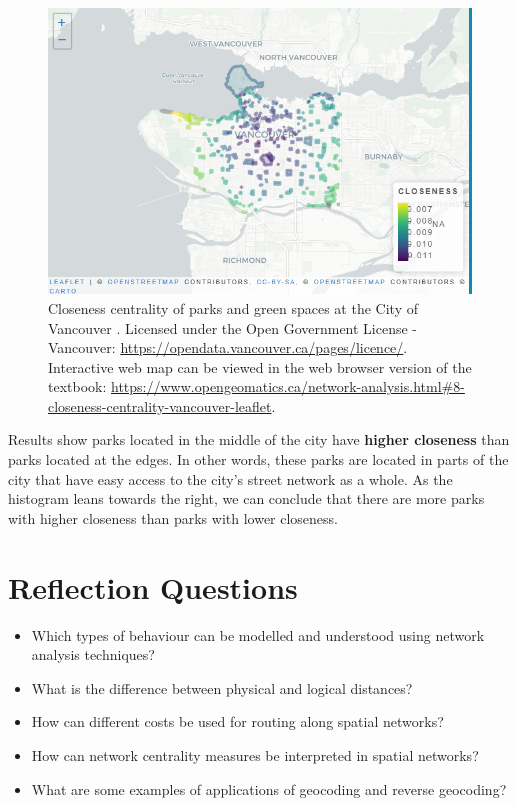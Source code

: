 \documentclass[
]{book}
\providecommand{\tightlist}{%
  \setlength{\itemsep}{0pt}\setlength{\parskip}{0pt}}
\begin{document}
\begin{figure}
\includegraphics[width=10.18in]{images/08-CLOSENESS-CENTRALITY-OF-PARKS-AND-GREEN-SPACES-AT-THE-CITY-OF-VANCOUVER-static} \caption{Closeness centrality of parks and green spaces at the City of Vancouver \citep{city_of_vancouver_open_nodate}. Licensed under the Open Government License - Vancouver: \url{https://opendata.vancouver.ca/pages/licence/}. Interactive web map can be viewed in the web browser version of the textbook: \url{https://www.opengeomatics.ca/network-analysis.html\#8-closeness-centrality-vancouver-leaflet}.}\label{fig:8-closeness-centrality-vancouver-leaflet}
\end{figure}

Results show parks located in the middle of the city have \textbf{higher closeness} than parks located at the edges. In other words, these parks are located in parts of the city that have easy access to the city's street network as a whole. As the histogram leans towards the right, we can conclude that there are more parks with higher closeness than parks with lower closeness.

\section*{Reflection Questions}\label{reflection-questions-5}

\begin{itemize}
\tightlist
\item
  Which types of behaviour can be modelled and understood using network analysis techniques?
\item
  What is the difference between physical and logical distances?
\item
  How can different costs be used for routing along spatial networks?
\item
  How can network centrality measures be interpreted in spatial networks?
\item
  What are some examples of applications of geocoding and reverse geocoding?
\end{itemize}
\end{document}

